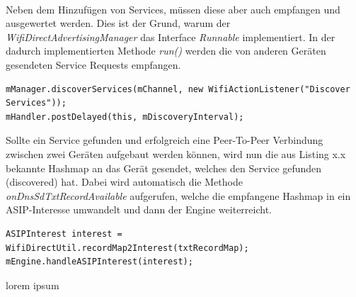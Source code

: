 \\Neben dem Hinzufügen von Services, müssen diese aber auch empfangen und ausgewertet werden. Dies ist der Grund, warum der \textit{WifiDirectAdvertisingManager} das Interface \textit{Runnable} implementiert. In der dadurch implementierten Methode \textit{run()} werden die von anderen Geräten gesendeten Service Requests empfangen.
\lstset{language=Java, caption=Erkennung von Services, label=DescriptiveLabel, numbers=left, numbersep=1em, breaklines=true, basicstyle=\small}
\begin{lstlisting}
mManager.discoverServices(mChannel, new WifiActionListener("Discover Services"));
mHandler.postDelayed(this, mDiscoveryInterval);
\end{lstlisting}
Sollte ein Service gefunden und erfolgreich eine Peer-To-Peer Verbindung zwischen zwei Geräten aufgebaut werden können, wird nun die aus Listing x.x bekannte Hashmap an das Gerät gesendet, welches den Service gefunden (discovered) hat. Dabei wird automatisch die Methode \textit{onDnsSdTxtRecordAvailable} aufgerufen, welche die empfangene Hashmap in ein ASIP-Interesse umwandelt und dann der Engine weiterreicht.
\lstset{language=Java, caption=Vewertung des Interesses, label=DescriptiveLabel, numbers=left, numbersep=1em, breaklines=true, basicstyle=\small}
\begin{lstlisting}
ASIPInterest interest = WifiDirectUtil.recordMap2Interest(txtRecordMap);
mEngine.handleASIPInterest(interest);
\end{lstlisting}  

lorem ipsum


